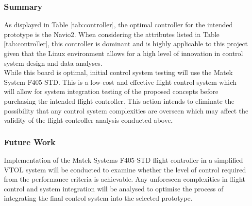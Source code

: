\subsubsection{Summary}
As displayed in Table \ref{tab:controller}, the optimal controller for the intended prototype is the Navio2. When considering the attributes listed in Table \ref{tab:controller}, this controller is dominant and is highly applicable to this project given that the Linux environment allows for a high level of innovation in control system design and data analyses.\\

While this board is optimal, initial control system testing will use the Matek System F405-STD. This is a low-cost and effective flight control system which will allow for system integration testing of the proposed concepts before purchasing the intended flight controller. This action intends to eliminate the possibility that any control system complexities are overseen which may affect the validity of the flight controller analysis conducted above. 

\subsubsection{Future Work}
Implementation of the Matek Systems F405-STD flight controller in a simplified VTOL system will be conducted to examine whether the level of control required from the performance criteria is achievable. Any unforeseen complexities in flight control and system integration will be analysed to optimise the process of integrating the final control system into the selected prototype. 